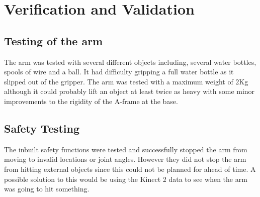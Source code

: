 \section{Verification and Validation}
\subsection{Testing of the arm}
The arm was tested with several different objects including, several water bottles, spools of wire and a ball. It had difficulty gripping a full water bottle as it slipped out of the gripper.
\newline
The arm was tested with a maximum weight of 2Kg although it could probably lift an object at least twice as heavy with some minor improvements to the rigidity of the A-frame at the base.
\subsection{Safety Testing}
The inbuilt safety functions were tested and successfully stopped the arm from moving to invalid locations or joint angles. However they did not stop the arm from hitting external objects since this could not be planned for ahead of time. A possible solution to this would be using the Kinect 2 data to see when the arm was going to hit something.




